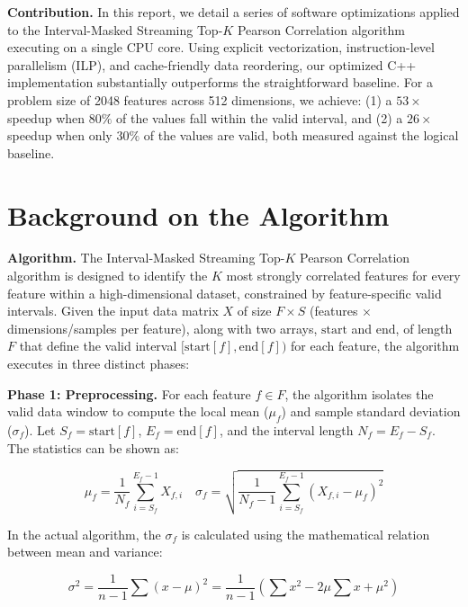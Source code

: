 \documentclass[letterpaper]{article}
\newcommand{\mypar}[1]{{\bf #1.}}
\begin{document}
\mypar{Contribution}
In this report, we detail a series of software optimizations applied to the Interval-Masked Streaming Top-$K$ Pearson Correlation algorithm executing on a single CPU core.
Using explicit vectorization, instruction-level parallelism (ILP), and cache-friendly data reordering, our optimized C++ implementation substantially outperforms the straightforward baseline.
For a problem size of 2048 features across 512 dimensions, we achieve: (1) a $53\times$ speedup when $80\%$ of the values fall within the valid interval, and (2) a $26\times$ speedup when only $30\%$ of the values are valid, both measured against the logical baseline.


\section{Background on the Algorithm}\label{sec:background}


\mypar{Algorithm}
The Interval-Masked Streaming Top-$K$ Pearson Correlation algorithm is designed to identify the $K$ most strongly correlated features for every feature within a high-dimensional dataset, constrained by feature-specific valid intervals.
Given the input data matrix $X$ of size $F \times S$ (features $\times$ dimensions/samples per feature), along with two arrays, $\text{start}$ and $\text{end}$, of length $F$ that define the valid interval $[\text{start}[f], \text{end}[f])$ for each feature, the algorithm executes in three distinct phases:

\textbf{Phase 1: Preprocessing.}
For each feature $f \in F$, the algorithm isolates the valid data window to compute the local mean ($\mu_f$) and sample standard deviation ($\sigma_f$).
Let $S_f = \text{start}[f]$, $E_f = \text{end}[f]$, and the interval length $N_f = E_f - S_f$.
The statistics can be shown as:

$$ \mu_f = \frac{1}{N_f} \sum_{i=S_f}^{E_f - 1} X_{f,i} \quad
\sigma_f = \sqrt{\frac{1}{N_f - 1} \sum_{i=S_f}^{E_f - 1} (X_{f,i} - \mu_f)^2} $$

In the actual algorithm, the $\sigma_f$ is calculated using the mathematical relation between mean and variance: 

$$ \sigma^2 = \frac{1}{n-1} \sum (x - \mu)^2 = \frac{1}{n-1}(\sum x^2 - 2 \mu \sum x + \mu^2) $$
\end{document}

